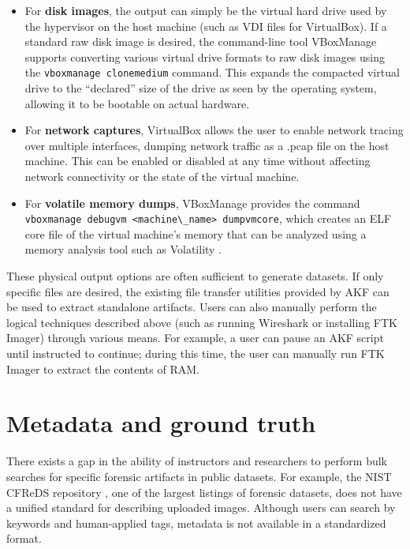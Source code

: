 \documentclass[letterpaper,12pt]{report}
\def\tightlist{}
\newcommand{\passthrough}[1]{#1}
\begin{document}
\begin{itemize}
\tightlist
\item
  For \textbf{disk images}, the output can simply be the virtual hard
  drive used by the hypervisor on the host machine (such as VDI files
  for VirtualBox). If a standard raw disk image is desired, the
  command-line tool VBoxManage supports converting various virtual drive
  formats to raw disk images using the
  \passthrough{\lstinline!vboxmanage clonemedium!} command. This expands
  the compacted virtual drive to the ``declared'' size of the drive as
  seen by the operating system, allowing it to be bootable on actual
  hardware.
\item
  For \textbf{network captures}, VirtualBox allows the user to enable
  network tracing over multiple interfaces, dumping network traffic as a
  .pcap file on the host machine. This can be enabled or disabled at any
  time without affecting network connectivity or the state of the
  virtual machine.
\item
  For \textbf{volatile memory dumps}, VBoxManage provides the command
  \passthrough{\lstinline!vboxmanage debugvm <machine\_name> dumpvmcore!},
  which creates an ELF core file of the virtual machine's memory that
  can be analyzed using a memory analysis tool such as Volatility
  \cite{volatilityfoundationVolatility32025}.
\end{itemize}

These physical output options are often sufficient to generate datasets.
If only specific files are desired, the existing file transfer utilities
provided by AKF can be used to extract standalone artifacts. Users can
also manually perform the logical techniques described above (such as
running Wireshark or installing FTK Imager) through various means. For
example, a user can pause an AKF script until instructed to continue;
during this time, the user can manually run FTK Imager to extract the
contents of RAM.

\section{Metadata and ground
truth}\label{metadata-and-ground-truth}

There exists a gap in the ability of instructors and researchers to
perform bulk searches for specific forensic artifacts in public
datasets. For example, the NIST CFReDS repository
\cite{nationalinstituteofstandardsandtechnologyCFReDSPortal}, one of
the largest listings of forensic datasets, does not have a unified
standard for describing uploaded images. Although users can search by
keywords and human-applied tags, metadata is not available in a
standardized format.
\end{document}
